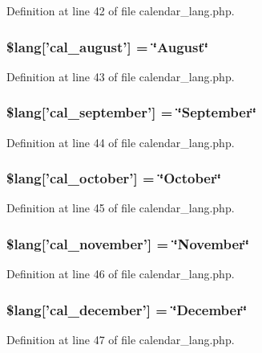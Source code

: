 Definition at line 42 of file calendar\-\_\-lang.\-php.

\subsubsection[{\$lang}]{\setlength{\rightskip}{0pt plus 5cm}\$lang['cal\-\_\-august'] = \char`\"{}August\char`\"{}}\label{calendar__lang_8php_a8e8cfd4eda2dda803f5c4f6cbbf2279f}


Definition at line 43 of file calendar\-\_\-lang.\-php.

\subsubsection[{\$lang}]{\setlength{\rightskip}{0pt plus 5cm}\$lang['cal\-\_\-september'] = \char`\"{}September\char`\"{}}\label{calendar__lang_8php_a7223c2b685dfa0a6e9a9ebec0e9e912b}


Definition at line 44 of file calendar\-\_\-lang.\-php.

\subsubsection[{\$lang}]{\setlength{\rightskip}{0pt plus 5cm}\$lang['cal\-\_\-october'] = \char`\"{}October\char`\"{}}\label{calendar__lang_8php_af49c3d53649acdf354e7cf9a210f7aa0}


Definition at line 45 of file calendar\-\_\-lang.\-php.

\subsubsection[{\$lang}]{\setlength{\rightskip}{0pt plus 5cm}\$lang['cal\-\_\-november'] = \char`\"{}November\char`\"{}}\label{calendar__lang_8php_aa05ad18c3c08c3184efd08188bdc2c56}


Definition at line 46 of file calendar\-\_\-lang.\-php.

\subsubsection[{\$lang}]{\setlength{\rightskip}{0pt plus 5cm}\$lang['cal\-\_\-december'] = \char`\"{}December\char`\"{}}\label{calendar__lang_8php_ac4bbc26ddae9900021fe967b02bc7a6c}


Definition at line 47 of file calendar\-\_\-lang.\-php.

